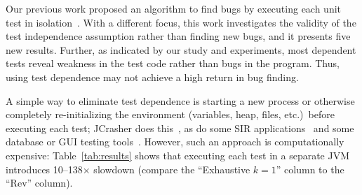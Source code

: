 Our previous work proposed
an algorithm to find bugs by executing each unit
test in isolation~\cite{DBLP:conf/sigsoft/MusluSW11}. With a different focus,
this work investigates the validity of the test independence assumption
rather than finding new bugs,
and it presents five new results.
Further, as indicated by our study and experiments, most dependent
tests reveal weakness in the test code rather than bugs in the program. Thus,
using test dependence may not achieve a high return in bug finding.

A simple way to eliminate test dependence is
starting a new process or otherwise completely re-initializing the environment (variables,
heap, files, etc.)\ before executing each test;
JCrasher does this~\cite{Csallner:2004}, as do
some SIR applications~\cite{sir} and
some database or GUI testing tools~\cite{kapfhammeretal:FSE:2003,
Chays:2000:FTD:347324.348954, Gray:1994:QGB:191843.191886
}.
However, such an approach is computationally expensive:
Table~\ref{tab:results} shows that executing each test in a
separate JVM introduces 10--138$\times$ slowdown (compare the 
``Exhaustive $k=1$'' column to the ``Rev'' column).






